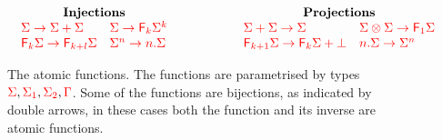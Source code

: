 \begin{figure}
$$
\begin{array}{cc}
\textbf{Injections} \qquad&\qquad \textbf{Projections}\\
\begin{array}{ll}
{\color{red}{\Sigma \to \Sigma+\Sigma}} & {\color{red}{\Sigma \to {\color{red}{\mathsf F_{k}}}\Sigma^k}}  \\ {\color{red}{{\color{red}{\mathsf F_{k}}}\Sigma \to {\color{red}{\mathsf F_{k+l}}}\Sigma}}  &  
{\color{red}{\Sigma^n\to  {\color{red}{n . \Sigma}}}}
\end{array}\qquad&\qquad
\begin{array}{ll}
{\color{red}{\Sigma+\Sigma\to \Sigma}} & {\color{red}{\Sigma\otimes \Sigma \to {\color{red}{\mathsf F_{1}}}\Sigma}} \\{\color{red}{{\color{red}{\mathsf F_{k+1}}}\Sigma \to {\color{red}{\mathsf F_{k}}}\Sigma+\bot}} &
{\color{red}{{\color{red}{n . \Sigma}} \to \Sigma^n}}
\end{array}
\end{array}
$$
\caption{    \label{fig:fo-term}The atomic functions. The functions are parametrised by types  ${\color{red}{\Sigma}}, {\color{red}{\Sigma_1}}, {\color{red}{\Sigma_2}}, {\color{red}{\Gamma}}$. Some of the functions are bijections, as indicated by double arrows, in these cases both the function and its inverse are atomic functions. }
\end{figure}



